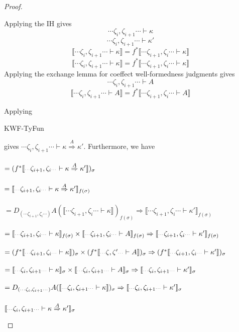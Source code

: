 \documentclass{article}
\newcommand{\sem}[1]{\llbracket #1 \rrbracket}
\newcommand{\scdots}{\scalebox{0.6}{$\cdots$}}
\begin{document}
\begin{proof}
\begin{description}
Applying the IH gives $$\cdots \zeta_i,\zeta_{i+1} \cdots \vdash \kappa$$ $$\cdots \zeta_i,\zeta_{i+1} \cdots \vdash \kappa'$$ $$\sem{\cdots \zeta_i,\zeta_{i+1} \cdots \vdash \kappa} = f^*\sem{\cdots \zeta_{i+1},\zeta_i \cdots \vdash \kappa}$$ $$\sem{\cdots \zeta_i,\zeta_{i+1} \cdots \vdash \kappa} = f^*\sem{\cdots \zeta_{i+1},\zeta_i \cdots \vdash \kappa} $$
Applying the exchange lemma for coeffect well-formedness judgments gives $$\cdots \zeta_{i},\zeta_{i+1} \cdots \vdash A$$ $$\sem{\cdots \zeta_i,\zeta_{i+1} \cdots \vdash A} = f^*\sem{\cdots \zeta_{i+1},\zeta_i \cdots \vdash A} $$

Applying \begin{sc}KWF-TyFun\end{sc} gives $\cdots \zeta_i,\zeta_{i+1} \cdots \vdash \kappa \overset{A}{\Rightarrow} \kappa'$. Furthermore, we have\\~\\
$= (f^* \sem{\scdots \zeta_{i+1},\zeta_i \scdots \vdash \kappa \overset{A}{\Rightarrow} \kappa'})_\sigma$\\~\\
$= \sem{\scdots \zeta_{i+1},\zeta_i \scdots \vdash \kappa \overset{A}{\Rightarrow} \kappa'}_{f(\sigma)}$\\~\\
$= D_{(\cdots \zeta_{i+1},\zeta_i \cdots)} A(\sem{\cdots \zeta_{i+1},\zeta_i \cdots \vdash \kappa})_{f(\sigma)} \Rightarrow \sem{\cdots \zeta_{i+1},\zeta_i \cdots \vdash \kappa'}_{f(\sigma)}$\\~\\
$= \sem{\scdots \zeta_{i+1},\zeta_i \scdots \vdash \kappa}_{f(\sigma)} \times \sem{\scdots \zeta_{i+1},\zeta_i \scdots \vdash A}_{f(\sigma)} \Rightarrow \sem{\scdots \zeta_{i+1},\zeta_i \scdots \vdash \kappa'}_{f(\sigma)}$\\~\\
$= (f^* \sem{\scdots \zeta_{i+1},\zeta_i \scdots \vdash \kappa})_\sigma \times (f^*\sem{\scdots \zeta,\zeta' \scdots \vdash A})_{\sigma} \Rightarrow (f^* \sem{\scdots \zeta_{i+1},\zeta_i \scdots \vdash \kappa'})_\sigma$\\~\\
$= \sem{\scdots \zeta_{i},\zeta_{i+1} \scdots \vdash \kappa}_\sigma \times \sem{\scdots \zeta_i,\zeta_{i+1} \scdots \vdash A}_{\sigma} \Rightarrow \sem{\scdots \zeta_i,\zeta_{i+1} \scdots \vdash \kappa'}_\sigma$\\~\\
$= D_{(\scdots \zeta_i,\zeta_{i+1} \scdots)} A(\sem{\scdots \zeta_{i},\zeta_{i+1} \scdots \vdash \kappa})_\sigma \Rightarrow \sem{\scdots \zeta_{i},\zeta_{i+1} \scdots \vdash \kappa'}_\sigma$\\~\\
$\sem{\scdots \zeta_i,\zeta_{i+1} \scdots \vdash \kappa \overset{A}{\Rightarrow} \kappa'}_\sigma$\\


\end{description}
\end{proof}
\end{document}
